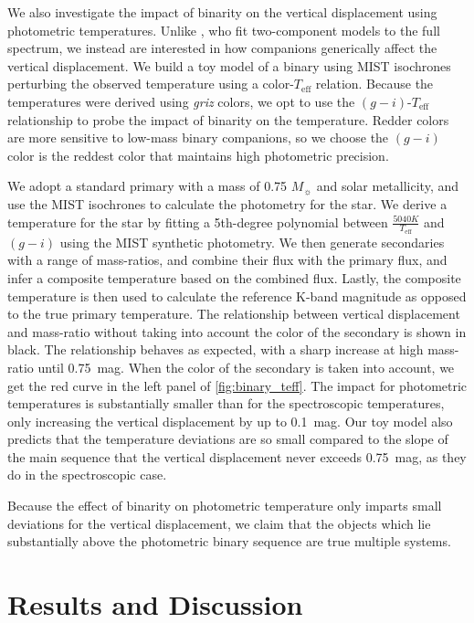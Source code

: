 \documentclass[twocolumn]{aastex6}
\newcommand{\Teff}{\ensuremath{T_{\textrm{eff}}}}
\begin{document}
We also investigate the impact of binarity on the vertical displacement using
photometric temperatures. Unlike \citet{ElBadry18b}, who fit two-component
models to the full spectrum, we instead are interested in how companions
generically affect the vertical displacement. We build a toy model of a binary
using MIST isochrones perturbing the observed temperature using a
color-\Teff{} relation. Because the \citet{Pinsonneault12} temperatures were 
derived using \textit{griz} colors, we opt to use the \((g-i)\)-\Teff{} 
relationship to probe the impact of binarity on the temperature. Redder colors
are more sensitive to low-mass binary companions, so we choose the 
\( (g-i) \) color is the reddest color that maintains high photometric precision.

We adopt a standard primary with a mass of 0.75 \(M_\sun\) and solar metallicity, 
and use the MIST isochrones to calculate the photometry for the star. We
derive a temperature for the star by fitting a 5th-degree polynomial between
\(\tfrac{5040 K}{\Teff}\) and \((g-i)\) using the MIST synthetic photometry. We
then generate secondaries with a range of mass-ratios, and combine their flux
with the primary flux, and infer a composite temperature based on the combined
flux. Lastly, the composite temperature is then used to calculate the reference
K-band magnitude as opposed to the true primary temperature. The relationship
between vertical displacement and mass-ratio without taking into account the
color of the secondary is shown in black. The relationship behaves as expected,
with a sharp increase at high mass-ratio until 0.75~mag. When the color of the 
secondary is taken into account, we get the red curve in the left panel of 
\cref{fig:binary_teff}. The impact for photometric temperatures is
substantially smaller than for the spectroscopic temperatures, only increasing
the vertical displacement by up to 0.1~mag. Our toy model also predicts that
the temperature deviations are so small compared to the slope of the main
sequence that the vertical displacement never exceeds 0.75~mag, as they do in
the spectroscopic case.

Because the effect of binarity on photometric temperature only imparts small 
deviations for the vertical displacement, we claim that the objects which lie
substantially above the photometric binary sequence are true multiple systems. 



\section{Results and Discussion}
\label{sec:results}
\end{document}
